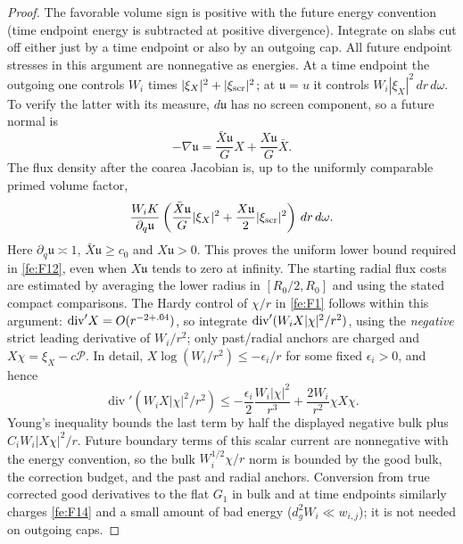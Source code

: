 \begin{proof}
The favorable volume sign is positive with the future energy convention (time endpoint energy is subtracted at positive divergence). Integrate on slabs cut off either just by a time endpoint or also by an outgoing cap. All future endpoint stresses in this argument are nonnegative as energies. At a time endpoint the outgoing one controls \(W_i\) times \(|\xi_X|^2+|\xi_{\rm scr}|^2\); at \(\mathfrak u=u\) it controls \(W_i|\xi_X|^2\,dr\,d\omega\).
To verify the latter with its measure, $d\mathfrak u$ has no screen
component, so a future normal is
\begin{equation*}
 -\nabla\mathfrak u=\frac{\bar X\mathfrak u}{G}X
                  +\frac{X\mathfrak u}{G}\bar X.
\end{equation*}
The flux density after the coarea Jacobian is, up to the uniformly
comparable primed volume factor,
\begin{equation*}
 \frac{W_iK}{\partial_q\mathfrak u}
 \left(\frac{\bar X\mathfrak u}{G}|\xi_X|^2
                +\frac{X\mathfrak u}{2}|\xi_{\rm scr}|^2\right)
       \,dr\,d\omega.
\end{equation*}
Here $\partial_q\mathfrak u\asymp1$, $\bar X\mathfrak u\ge c_0$ and
$X\mathfrak u>0$.  This proves the uniform lower bound required in
\eqref{fe:F12}, even when $X\mathfrak u$ tends to zero at infinity.
 The starting radial flux costs are estimated by averaging the lower radius in \([R_0/2,R_0]\) and using the stated compact comparisons. The Hardy control of \(\chi/r\) in \eqref{fe:F1} follows within this argument: \({\rm div}' X=O(r^{-2+.04})\), so integrate \({\rm div}'(W_i X|\chi|^2/r^2)\), using the \emph{negative} strict leading derivative of \(W_i/r^2\); only past/radial anchors are charged and \(X\chi=\xi_X-c\mathcal P\).
In detail, $X\log(W_i/r^2)\le-\epsilon_i/r$ for some fixed
$\epsilon_i>0$, and hence
\begin{equation*}
 \operatorname{div}'(W_iX|\chi|^2/r^2)
 \le -\frac{\epsilon_i}{2}\frac{W_i|\chi|^2}{r^3}
            +\frac{2W_i}{r^2}\chi X\chi.
\end{equation*}
Young's inequality bounds the last term by half the displayed negative
bulk plus $C_iW_i|X\chi|^2/r$.  Future boundary terms of this scalar
current are nonnegative with the energy convention, so the bulk
$W_i^{1/2}\chi/r$ norm is bounded by the good bulk, the correction
budget, and the past and radial anchors.
 Conversion from true corrected good derivatives to the flat \(G_1\) in bulk and at time endpoints similarly charges \eqref{fe:F14} and a small amount of bad energy (\(d_g^2 W_i\ll w_{i,j}\)); it is not needed on outgoing caps.

\end{proof}
